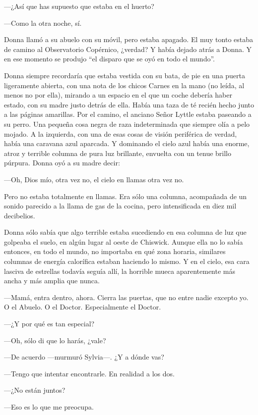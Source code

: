 ---¿Así que has supuesto que estaba en el huerto?

---Como la otra noche, sí.

Donna llamó a su abuelo con su móvil, pero estaba apagado. El muy tonto
estaba de camino al Observatorio Copérnico, ¿verdad? Y había dejado
atrás a Donna. Y en ese momento se produjo ``el disparo que se oyó en
todo el mundo''.

Donna siempre recordaría que estaba vestida con su bata, de pie en una
puerta ligeramente abierta, con una nota de los chicos Carnes en la mano
(no leída, al menos no por ella), mirando a un espacio en el que un
coche debería haber estado, con su madre justo detrás de ella. Había una
taza de té recién hecho junto a las páginas amarillas. Por el camino, el
anciano Señor Lyttle estaba paseando a su perro. Una pequeña cosa negra
de raza indeterminada que siempre olía a pelo mojado. A la izquierda,
con una de esas cosas de visión periférica de verdad, había una caravana
azul aparcada. Y dominando el cielo azul había una enorme, atroz y
terrible columna de pura luz brillante, envuelta con un tenue brillo
púrpura. Donna oyó a su madre decir:

---Oh, Dios mío, otra vez no, el cielo en llamas otra vez no.

Pero no estaba totalmente en llamas. Era sólo una columna, acompañada de
un sonido parecido a la llama de gas de la cocina, pero intensificada en
diez mil decibelios.

Donna sólo sabía que algo terrible estaba sucediendo en esa columna de
luz que golpeaba el suelo, en algún lugar al oeste de Chiswick. Aunque
ella no lo sabía entonces, en todo el mundo, no importaba en qué zona
horaria, similares columnas de energía calorífica estaban haciendo lo
mismo. Y en el cielo, esa cara lasciva de estrellas todavía seguía allí,
la horrible mueca aparentemente más ancha y más amplia que nunca.

---Mamá, entra dentro, ahora. Cierra las puertas, que no entre nadie
excepto yo. O el Abuelo. O el Doctor. Especialmente el Doctor.

---¿Y por qué es tan especial?

---Oh, sólo di que lo harás, ¿vale?

---De acuerdo ---murmuró Sylvia---. ¿Y a dónde vas?

---Tengo que intentar encontrarle. En realidad a los dos.

---¿No están juntos?

---Eso es lo que me preocupa.

